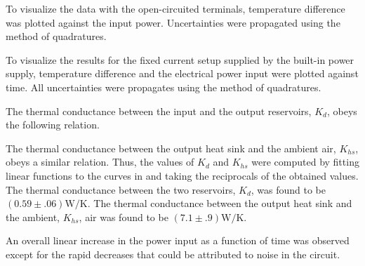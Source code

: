 \begin{paper}
	
	To visualize the data with the open-circuited terminals, temperature difference was plotted against the input power. Uncertainties were propagated using the method of quadratures.
	
	
	To visualize the results for the fixed current setup supplied by the built-in power supply, temperature difference and the electrical power input were plotted against time. All uncertainties were propagates using the method of quadratures.
	
	The thermal conductance between the input and the output reservoirs, $K_d$, obeys the following relation.
	
	
	The thermal conductance between the output heat sink and the ambient air, $K_{hs}$, obeys a similar relation. Thus, the values of $K_d$ and $K_{hs}$ were computed by fitting linear functions to the curves in \figPartOne and taking the reciprocals of the obtained values. The thermal conductance between the two reservoirs, $K_d$, was found to be $(0.59\pm.06)\si{\watt\per\kelvin}$.
The thermal conductance between the output heat sink and the ambient, $K_{hs}$, air was found to be $(7.1\pm.9)\si{\watt\per\kelvin}$.
	
	
	An overall linear increase in the power input as a function of time was observed except for the rapid decreases that could be attributed to noise in the circuit.
	

\end{paper}
